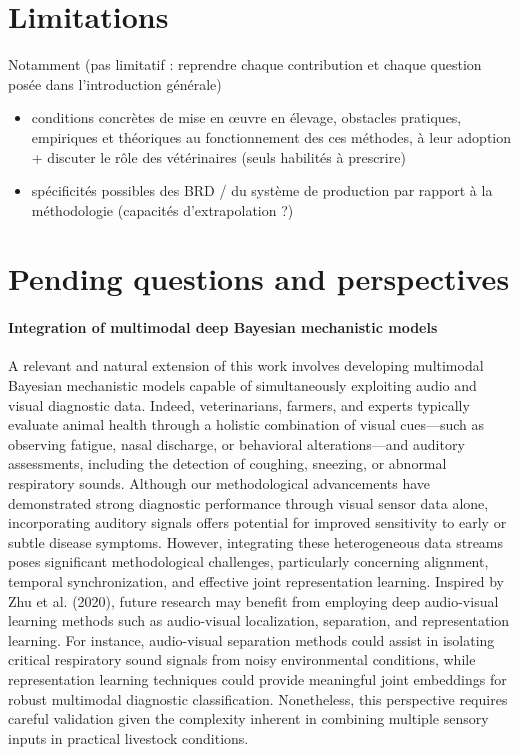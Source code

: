 \section{Limitations}
Notamment (pas limitatif : reprendre chaque contribution et chaque question posée dans l'introduction générale)
\begin{itemize}
    \item conditions concrètes de mise en \oe{}uvre en élevage, obstacles pratiques, empiriques et théoriques au fonctionnement des ces méthodes, à leur adoption + discuter le rôle des vétérinaires (seuls habilités à prescrire)
    \item spécificités possibles des BRD / du système de production par rapport à la méthodologie (capacités d'extrapolation ?)
\end{itemize}

\section{Pending questions and perspectives}



\paragraph{Integration of multimodal deep Bayesian mechanistic models} A relevant and natural extension of this work involves developing multimodal Bayesian mechanistic models capable of simultaneously exploiting audio and visual diagnostic data. Indeed, veterinarians, farmers, and experts typically evaluate animal health through a holistic combination of visual cues—such as observing fatigue, nasal discharge, or behavioral alterations—and auditory assessments, including the detection of coughing, sneezing, or abnormal respiratory sounds. Although our methodological advancements have demonstrated strong diagnostic performance through visual sensor data alone, incorporating auditory signals offers potential for improved sensitivity to early or subtle disease symptoms. However, integrating these heterogeneous data streams poses significant methodological challenges, particularly concerning alignment, temporal synchronization, and effective joint representation learning. Inspired by Zhu et al. (2020), future research may benefit from employing deep audio-visual learning methods such as audio-visual localization, separation, and representation learning. For instance, audio-visual separation methods could assist in isolating critical respiratory sound signals from noisy environmental conditions, while representation learning techniques could provide meaningful joint embeddings for robust multimodal diagnostic classification. Nonetheless, this perspective requires careful validation given the complexity inherent in combining multiple sensory inputs in practical livestock conditions.
 
